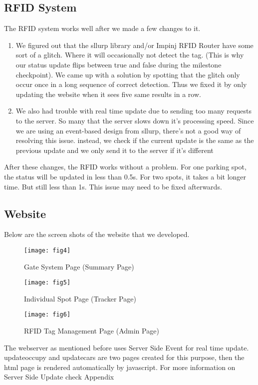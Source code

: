 \documentclass[12pt, a4paper]{article}
\begin{document}
\subsection{RFID System}
The RFID system works well after we made a few changes to it.
\begin{enumerate}
	\item We figured out that the sllurp library and/or Impinj RFID Router have some sort of a glitch. Where it will occasionally not detect the tag. (This is why our status update flips between true and false during the milestone checkpoint). We came up with a solution by spotting that the glitch only occur once in a long sequence of correct detection. Thus we fixed it by only updating the website when it sees five same results in a row.
	\item We also had trouble with real time update due to sending too many requests to the server. So many that the server slows down it's processing speed. Since we are using an event-based design from sllurp, there's not a good way of resolving this issue. instead, we check if the current update is the same as the previous update and we only send it to the server if it's different
\end{enumerate}
After these changes, the RFID works without a problem. For one parking spot, the status will be updated in less than 0.5s. For two spots, it takes a bit longer time. But still less than 1s. This issue may need to be fixed afterwards.
\subsection{Website}
Below are the screen shots of the website that we developed.
\begin{figure}[H]
	\centering
	\texttt{[image: fig4]}
	\caption{Gate System Page (Summary Page)}
\end{figure}
\begin{figure}[H]
	\centering
	\texttt{[image: fig5]}
	\caption{Individual Spot Page (Tracker Page)}
\end{figure}
\begin{figure}[H]
	\centering
	\texttt{[image: fig6]}
	\caption{RFID Tag Management Page (Admin Page)}
\end{figure}
The webserver as mentioned before uses Server Side Event for real time update. updateoccupy and updatecars are two pages created for this purpose, then the html page is rendered automatically by javascript. For more information on Server Side Update check Appendix
\end{document}
